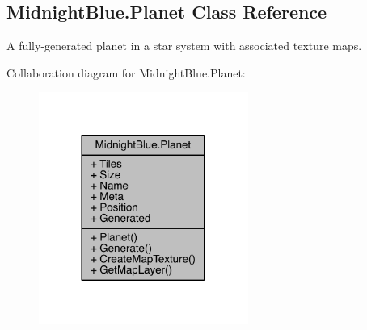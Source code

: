 \hypertarget{class_midnight_blue_1_1_planet}{}\subsection{Midnight\+Blue.\+Planet Class Reference}
\label{class_midnight_blue_1_1_planet}


A fully-\/generated planet in a star system with associated texture maps.  




Collaboration diagram for Midnight\+Blue.\+Planet\+:\nopagebreak
\begin{figure}[H]
\begin{center}
\leavevmode
\includegraphics[width=194pt]{class_midnight_blue_1_1_planet__coll__graph}
\end{center}
\end{figure}
